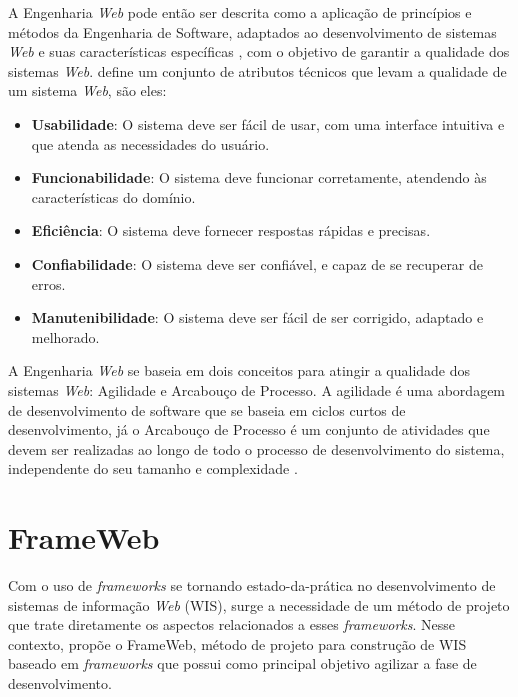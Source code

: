 A Engenharia \textit{Web} pode então ser descrita como a aplicação de princípios e métodos da Engenharia
de Software, adaptados ao desenvolvimento de sistemas \textit{Web} e suas características específicas 
\cite{beder:2017,murugesan:2001}, com o objetivo de garantir a qualidade dos sistemas \textit{Web}. 
\cite{olsina:2001} define um conjunto de atributos técnicos que levam a qualidade de um sistema \textit{Web},
são eles:

\begin{itemize}
    \item \textbf{Usabilidade}: O sistema deve ser fácil de usar, com uma interface intuitiva e 
        que atenda as necessidades do usuário.
    \item \textbf{Funcionabilidade}: O sistema deve funcionar corretamente, atendendo às características
        do domínio.
    \item \textbf{Eficiência}: O sistema deve fornecer respostas rápidas e precisas.
    \item \textbf{Confiabilidade}: O sistema deve ser confiável, e capaz de se recuperar de erros.
    \item \textbf{Manutenibilidade}: O sistema deve ser fácil de ser corrigido, adaptado e melhorado.
\end{itemize}

A Engenharia \textit{Web} se baseia em dois conceitos para atingir a qualidade dos sistemas \textit{Web}: Agilidade e Arcabouço de Processo.
A agilidade é uma abordagem de desenvolvimento de software que se baseia em ciclos curtos de desenvolvimento,
já o Arcabouço de Processo é um conjunto de atividades que devem ser realizadas ao longo de todo o processo
de desenvolvimento do sistema, independente do seu tamanho e complexidade \cite{beder:2017}.



\section{FrameWeb}
\label{sec-fundteo-frameweb}

Com o uso de \textit{frameworks} se tornando estado-da-prática no  desenvolvimento 
de sistemas de informação \textit{Web} (WIS), surge a necessidade de um método de projeto
que trate diretamente os aspectos relacionados a esses \textit{frameworks}.
Nesse contexto,  propõe o FrameWeb, método de projeto 
para construção de WIS baseado em \textit{frameworks} que possui como principal 
objetivo agilizar a fase de desenvolvimento.

